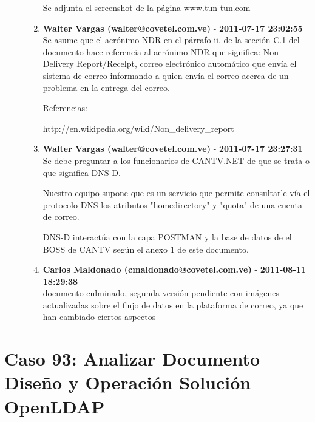\begin{description}
\begin{enumerate}
Se adjunta el screenshot de la página www.tun-tun.com        \item {\bfseries Walter Vargas (walter@covetel.com.ve)  } - {\bfseries 2011-07-17 23:02:55} \\ Se asume que el acrónimo NDR en el párrafo ii. de la sección C.1 del documento
hace referencia al acrónimo NDR que significa: Non Delivery Report/Recelpt,
correo electrónico automático que envía el sistema de correo informando a quien
envía el correo acerca de un problema en la entrega del correo.

Referencias:

http://en.wikipedia.org/wiki/Non_delivery_report        \item {\bfseries Walter Vargas (walter@covetel.com.ve)  } - {\bfseries 2011-07-17 23:27:31} \\ Se debe preguntar a los funcionarios de CANTV.NET de que se trata o que
significa DNS-D.

Nuestro equipo supone que es un servicio que permite consultarle vía el
protocolo DNS los atributos "homedirectory" y "quota" de una cuenta de correo.

DNS-D interactúa con la capa POSTMAN y la base de datos de el BOSS de CANTV
según el anexo 1 de este documento.        \item {\bfseries Carlos Maldonado (cmaldonado@covetel.com.ve)  } - {\bfseries 2011-08-11 18:29:38} \\ documento culminado, segunda versión pendiente con imágenes actualizadas sobre el flujo de datos en la plataforma de correo, ya que han cambiado ciertos aspectos    \end{enumerate}

\end{description}

\section{Caso 93: Analizar Documento Diseño y Operación Solución OpenLDAP }

